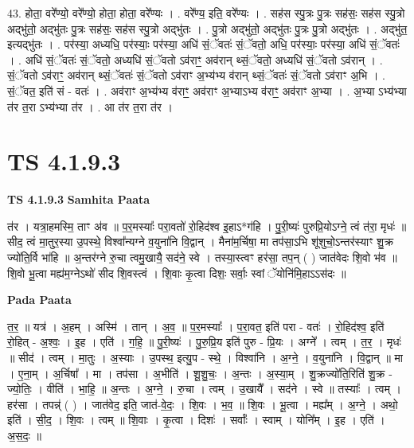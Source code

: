 \documentclass[17pt]{extarticle}
\begin{document}
43. होता॒ वरे᳚ण्यो॒ वरे᳚ण्यो॒ होता॒ होता॒ वरे᳚ण्यः । . वरे᳚ण्य॒ इति॒ वरे᳚ण्यः । . सह॑स स्पु॒त्रः पु॒त्रः सह॑सः॒ सह॑स स्पु॒त्रो अद्भु॑तो॒ अद्भु॑तः पु॒त्रः सह॑सः॒ सह॑स स्पु॒त्रो अद्भु॑तः । . पु॒त्रो अद्भु॑तो॒ अद्भु॑तः पु॒त्रः पु॒त्रो अद्भु॑तः । . अद्भु॑त॒ इत्यद्भु॑तः । . पर॑स्या॒ अध्यधि॒ पर॑स्याः॒ पर॑स्या॒ अधि॑ सं॒ॅवतः॑ सं॒ॅवतो॒ अधि॒ पर॑स्याः॒ पर॑स्या॒ अधि॑ सं॒ॅवतः॑ । . अधि॑ सं॒ॅवतः॑ सं॒ॅवतो॒ अध्यधि॑ सं॒ॅवतो ऽव॑राꣳ॒॒ अव॑रान् थ्सं॒ॅवतो॒ अध्यधि॑ सं॒ॅवतो ऽव॑रान् । . सं॒ॅवतो ऽव॑राꣳ॒॒ अव॑रान् थ्सं॒ॅवतः॑ सं॒ॅवतो ऽव॑राꣳ अ॒भ्य॑भ्य व॑रान् थ्सं॒ॅवतः॑ सं॒ॅवतो ऽव॑राꣳ अ॒भि । . सं॒ॅवत॒ इति॑ सं - वतः॑ । . अव॑राꣳ अ॒भ्य॑भ्य व॑राꣳ॒॒ अव॑राꣳ अ॒भ्याऽभ्य व॑राꣳ॒॒ अव॑राꣳ अ॒भ्या । . अ॒भ्या ऽभ्य॑भ्या त॑र त॒रा ऽभ्य॑भ्या त॑र । . आ त॑र त॒रा त॑र । \newline
\pagebreak
{}

\section{ TS 4.1.9.3 }

\textbf{TS 4.1.9.3 } \newline
\textbf{Samhita Paata} \newline

त॑र । यत्रा॒हमस्मि॒ ताꣳ अ॑व ॥ प॒र॒मस्याः᳚ परा॒वतो॑ रो॒हिद॑श्व इ॒हाऽ*ग॑हि । पु॒री॒ष्यः॑ पुरुप्रि॒योऽग्ने॒ त्वं त॑रा॒ मृधः॑ ॥ सीद॒ त्वं मा॒तुर॒स्या उ॒पस्थे॒ विश्वा᳚न्यग्ने व॒युना॑नि वि॒द्वान् । मैना॑म॒र्चिषा॒ मा तप॑सा॒ऽभि शू॑शुचो॒ऽन्तर॑स्याꣳ शु॒क्र ज्यो॑ति॒र्वि भा॑हि ॥ अ॒न्तर॑ग्ने रु॒चा त्वमु॒खायै॒ सद॑ने॒ स्वे । तस्या॒स्त्वꣳ हर॑सा॒ तप॒न् ( ) जात॑वेदः शि॒वो भ॑व ॥ शि॒वो भू॒त्वा मह्य॑म॒ग्नेऽथो॑ सीद शि॒वस्त्वं । शि॒वाः कृ॒त्वा दिशः॒ सर्वाः॒ स्वां ॅयोनि॑मि॒हाऽऽस॑दः ॥ \newline

\textbf{Pada Paata} \newline

त॒र॒ ॥ यत्र॑ । अ॒हम् । अस्मि॑ । तान् । अ॒व॒ ॥ प॒र॒मस्याः᳚ । प॒रा॒वत॒ इति॑ परा - वतः॑ । रो॒हिद॑श्व॒ इति॑ रो॒हित् - अ॒श्वः॒ । इ॒ह । एति॑ । ग॒हि॒ ॥ पु॒री॒ष्यः॑ । पु॒रु॒प्रि॒य इति॑ पुरु - प्रि॒यः । अग्ने᳚ । त्वम् । त॒र॒ । मृधः॑ ॥ सीद॑ । त्वम् । मा॒तुः । अ॒स्याः । उ॒पस्थ॒ इत्यु॒प - स्थे॒ । विश्वा॑नि । अ॒ग्ने॒ । व॒युना॑नि । वि॒द्वान् ॥ मा । ए॒ना॒म् । अ॒र्चिषा᳚ । मा । तप॑सा । अ॒भीति॑ । शू॒शु॒चः॒ । अ॒न्तः । अ॒स्या॒म् । शु॒क्रज्यो॑ति॒रिति॑ शु॒क्र - ज्यो॒तिः॒ । वीति॑ । भा॒हि॒ ॥ अ॒न्तः । अ॒ग्ने॒ । रु॒चा । त्वम् । उ॒खायै᳚ । सद॑ने । स्वे ॥ तस्याः᳚ । त्वम् । हर॑सा । तपन्न्॑ ( ) । जात॑वेद॒ इति॒ जात॑-वे॒दः॒ । शि॒वः । भ॒व॒ ॥ शि॒वः । भू॒त्वा । मह्य᳚म् । अ॒ग्ने॒ । अथो॒ इति॑ । सी॒द॒ । शि॒वः । त्वम् ॥ शि॒वाः । कृ॒त्वा । दिशः॑ । सर्वाः᳚ । स्वाम् । योनि᳚म् । इ॒ह । एति॑ । अ॒स॒दः॒ ॥  \newline
\end{document}
